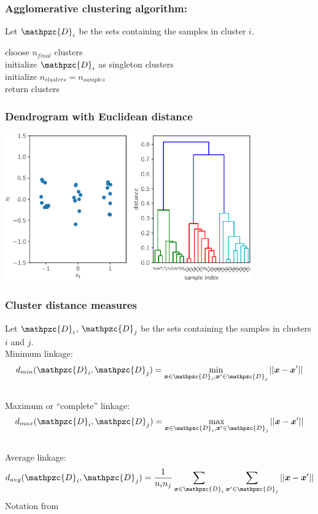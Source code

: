 \documentclass[Nike]{tuberlinbeamer}
\newcommand{\x}{\boldsymbol{x}}
\begin{document}
\begin{frame}
  \frametitle{Agglomerative clustering algorithm:}
  Let $\mathpzc{D}_i$ be the sets containing the samples in cluster $i$.  \\
  \bigskip

  choose $n_{final}$ clusters\\
  initialize $\mathpzc{D}_i$ as singleton clusters\\
  initialize $n_{clusters} = n_{samples}$\\
  return clusters
\end{frame}

\begin{frame}
  \frametitle{Dendrogram with Euclidean distance}
  \begin{center}
    \centering\includegraphics[width=0.8\textwidth]{dendrogram_euclidean.pdf}
  \end{center}
\end{frame}


\begin{frame}
  \frametitle{Cluster distance measures}
  Let $\mathpzc{D}_i$, $\mathpzc{D}_j$ be the sets containing the samples in clusters $i$ and $j$.
  \\
  Minimum linkage:
  \begin{equation*}
    d_{min}(\mathpzc{D}_i, \mathpzc{D}_j) = \min_{\x \in \mathpzc{D}_i, \x' \in \mathpzc{D}_j} ||\x - \x'||
  \end{equation*}
  \pause
  \\
  Maximum or ``complete'' linkage:
  \begin{equation*}
    d_{max}(\mathpzc{D}_i, \mathpzc{D}_j) = \max_{\x \in \mathpzc{D}_i, \x' \in \mathpzc{D}_j} ||\x - \x'||
  \end{equation*}
  \\
  \pause
  Average linkage:
  \begin{equation*}
    d_{avg}(\mathpzc{D}_i, \mathpzc{D}_j) = \frac{1}{n_i n_j} \sum_{\x \in \mathpzc{D}_i} \sum_{\x' \in \mathpzc{D}_j} ||\x - \x'||
  \end{equation*}
  \scriptsize Notation from \cite{duda2012pattern}
\end{frame}
\end{document}
